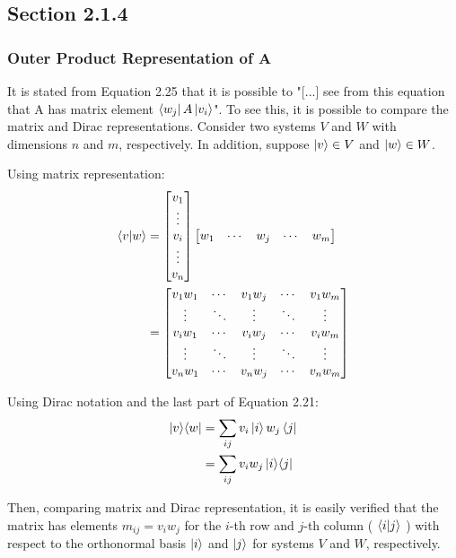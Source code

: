 \subsection{Section 2.1.4}
\subsubsection{Outer Product Representation of A}
    \label{sec:nielsen-and-chuang-outer-product-of-a}
    It is stated from Equation 2.25 that it is possible to
    "[...] see from this equation that A has matrix element
    $\bra{w_j}A\ket{v_i}$".
    To see this, it is possible to compare the matrix and
    Dirac representations. Consider two systems $V$ and $W$
    with dimensions $n$ and $m$, respectively.
    In addition, suppose $\ket{v} \in V$ and $\ket{w} \in W$. 
    
    Using matrix representation:
    \begin{align}
        \mathop{\mathinner{ \langle{v}|{w}\rangle}} &= \left[ \begin{matrix}
            v_1 \\ \vdots \\ v_i \\ \vdots \\ v_n
            \end{matrix} \right]
            \left[ \begin{matrix}
            w_1 & \cdots & w_j & \cdots & w_m
            \end{matrix} \right] \\
        &= \left[ \begin{matrix}
            v_1 w_1 & \cdots & v_1 w_j & \cdots & v_1 w_m \\
            \vdots & \ddots & \vdots & \ddots & \vdots \\
            v_i w_1 & \cdots & v_i w_j & \cdots & v_i w_m \\
            \vdots & \ddots & \vdots & \ddots & \vdots \\
            v_n w_1 & \cdots & v_n w_j & \cdots & v_n w_m
            \end{matrix} \right]
    \end{align}
    
    Using Dirac notation and the last part of Equation 2.21:
    \begin{align}
        \mathop{\mathinner{ |{v}\rangle \langle{w}|}} &= \sum_{ij} v_i\ket{i} w_j\bra{j} \\
            &= \sum_{ij} v_i w_j \mathop{\mathinner{ |{i}\rangle \langle{j}|}}
    \end{align}
    
    Then, comparing matrix and Dirac representation,
    it is easily verified that the matrix has elements
    $m_{ij} = v_i w_j$ for the $i$-th row and $j$-th column
    ( $\mathop{\mathinner{ \langle{i}|{j}\rangle}}$ )
    with respect to the orthonormal basis $\ket{i}$ and $\ket{j}$
    for systems $V$ and $W$, respectively.